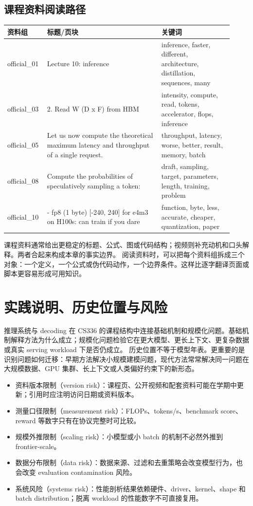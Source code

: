 \documentclass[a4paper]{article}
\begin{document}
\subsection{课程资料阅读路径}
\begin{longtable}{p{0.14\linewidth}p{0.48\linewidth}p{0.30\linewidth}}
\toprule
\textbf{资料组} & \textbf{标题/页块} & \textbf{关键词}\\
\midrule
official\_01 & Lecture 10: inference & inference, faster, different, architecture, distillation, sequences, many\\
official\_03 & 2. Read W (D x F) from HBM & intensity, compute, read, tokens, accelerator, flops, inference\\
official\_05 & Let us now compute the theoretical maximum latency and throughput of a single request. & throughput, latency, worse, better, result, memory, batch\\
official\_08 & Compute the probabilities of speculatively sampling a token: & draft, sampling, target, parameters, length, training, problem\\
official\_10 & - fp8 (1 byte) [-240, 240] for e4m3 on H100s: can train if you dare & function, byte, less, accurate, cheaper, quantization, paper\\
\bottomrule
\end{longtable}
课程资料通常给出更稳定的标题、公式、图或代码结构；视频则补充动机和口头解释。两者合起来构成本章的事实边界。
阅读资料时，可以把每个资料组拆成三个对象：一个定义，一个公式或伪代码动作，一个边界条件。这样比逐字翻译页面或脚本更容易形成可用知识。
\section{实践说明、历史位置与风险}
推理系统与 decoding 在 CS336 的课程结构中连接基础机制和规模化问题。基础机制解释方法为什么成立；规模化问题检验它在更大模型、更长上下文、更复杂数据或真实 serving workload 下是否仍成立。
历史位置不等于模型年表。更重要的是识别问题如何迁移：早期方法解决小规模建模问题，现代方法常常解决同一问题在大规模数据、GPU 集群、长上下文或人类偏好约束下的新形态。
\begin{itemize}
\item 资料版本限制（version risk）：课程页、公开视频和配套资料可能在学期中更新；引用时应注明访问日期或资料版本。
\item 测量口径限制（measurement risk）：FLOPs、tokens/s、benchmark score、reward 等数字只有在协议完整时可比较。
\item 规模外推限制（scaling risk）：小模型或小 batch 的机制不必然外推到 frontier-scale。
\item 数据分布限制（data risk）：数据来源、过滤和去重策略会改变模型行为，也会改变 evaluation contamination 风险。
\item 系统风险（systems risk）：性能剖析结果依赖硬件、driver、kernel、shape 和 batch distribution；脱离 workload 的性能数字不可直接复用。
\end{itemize}
\end{document}
